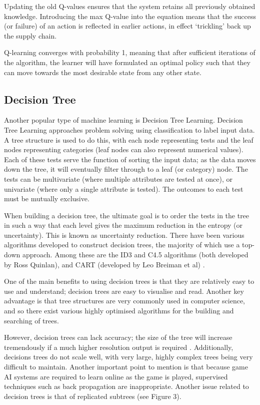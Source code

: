 \documentclass[a4paper,oneside]{report}
\begin{document}
Updating the old Q-values ensures that the system retains all previously obtained knowledge. Introducing the max Q-value into the equation means that the success (or failure) of an action is reflected in earlier actions, in effect `trickling' back up the supply chain.

Q-learning converges with probability 1, meaning that after sufficient iterations of the algorithm, the learner will have formulated an optimal policy such that they can move towards the most desirable state from any other state.

\subsection{Decision Tree}

Another popular type of machine learning is Decision Tree Learning. Decision Tree Learning approaches problem solving using classification to label input data. A tree structure is used to do this, with each node representing tests and the leaf nodes representing categories (leaf nodes can also represent numerical values). Each of these tests serve the function of sorting the input data; as the data moves down the tree, it will eventually filter through to a leaf (or category) node. The tests can be multivariate (where multiple attributes are tested at once), or univariate (where only a single attribute is tested). The outcomes to each test must be mutually exclusive. 

When building a decision tree, the ultimate goal is to order the tests in the tree in such a way that each level gives the maximum reduction in the entropy (or uncertainty). This is known as uncertainty reduction. There have been various algorithms developed to construct decision trees, the majority of which use a top-down approach. Among these are the ID3 and C4.5 algorithms (both developed by Ross Quinlan), and CART (developed by Leo Breiman et al) \cite{Quinlan86inductionof,Quinlan:1993:CPM:152181,breiman1984classification}.

One of the main benefits to using decision trees is that they are relatively easy to use and understand; decision trees are easy to visualise and read. Another key advantage is that tree structures are very commonly used in computer science, and so there exist various highly optimised algorithms for the building and searching of trees.

However, decision trees can lack accuracy; the size of the tree will increase tremendously if a much higher resolution output is required \cite{schwab2004ai}. Additionally, decisions trees do not scale well, with very large, highly complex trees being very difficult to maintain. Another important point to mention is that because game AI systems are required to learn online as the game is played, supervised techniques such as back propagation are inappropriate. Another issue related to decision trees is that of replicated subtrees (see Figure 3).
\end{document}
